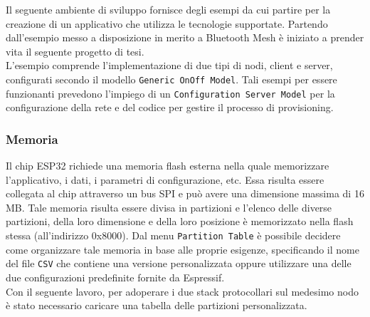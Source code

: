 \noindent Il seguente ambiente di sviluppo fornisce degli esempi da cui partire per la creazione di un applicativo che utilizza le tecnologie supportate. Partendo dall'esempio messo a disposizione in merito a Bluetooth Mesh è iniziato a prender vita il seguente progetto di tesi. \\
L'esempio comprende l'implementazione di due tipi di nodi, client e server, configurati secondo il modello \texttt{Generic OnOff Model}. Tali esempi per essere funzionanti prevedono l'impiego di un \texttt{Configuration Server Model} per la configurazione della rete e del codice per gestire il processo di provisioning.

\subsubsection{Memoria} 
Il chip ESP32 richiede una memoria flash esterna nella quale memorizzare l'applicativo, i dati, i parametri di configurazione, etc. Essa risulta essere collegata al chip attraverso un bus SPI e può avere una dimensione massima di 16 MB. Tale memoria risulta essere divisa in partizioni e l'elenco delle diverse partizioni, della loro dimensione e della loro posizione è memorizzato nella flash stessa (all'indirizzo 0x8000). Dal menu \texttt{Partition Table} è possibile decidere come organizzare tale memoria in base alle proprie esigenze, specificando il nome del file \texttt{CSV} che contiene una versione personalizzata oppure utilizzare una delle due configurazioni predefinite fornite da Espressif.\\
Con il seguente lavoro, per adoperare i due stack protocollari sul medesimo nodo è stato necessario caricare una tabella delle partizioni personalizzata.


